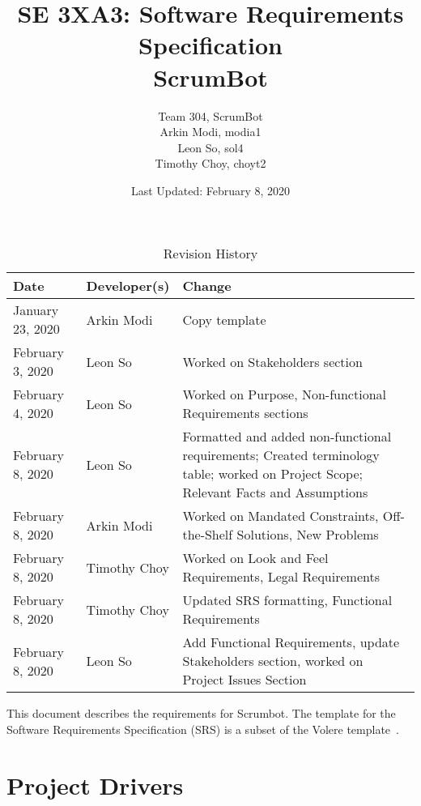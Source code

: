 \documentclass[12pt, titlepage]{article}
\title{SE 3XA3: Software Requirements Specification\\ScrumBot}
\author{
    Team 304, ScrumBot
        \\ Arkin Modi, modia1
        \\ Leon So, sol4
        \\ Timothy Choy, choyt2
}
\date{Last Updated: February 8, 2020}
\begin{document}
\maketitle

\tableofcontents
\listoftables
\listoffigures

\newpage

\begin{table}[!hbp]
    \caption{Revision History} \label{TblRevisionHistory}
    \begin{tabularx}{\textwidth}{llX}
        \toprule
            \textbf{Date} & \textbf{Developer(s)} & \textbf{Change}\\
        \midrule
            January 23, 2020 & Arkin Modi & Copy template\\
            February 3, 2020 & Leon So & Worked on Stakeholders section\\
            February 4, 2020 & Leon So & Worked on Purpose, Non-functional Requirements sections\\
            February 8, 2020 & Leon So & Formatted and added non-functional requirements; Created terminology table; worked on Project Scope; Relevant Facts and Assumptions\\
            February 8, 2020 & Arkin Modi & Worked on Mandated Constraints, Off-the-Shelf Solutions, New Problems\\
            February 8, 2020 & Timothy Choy & Worked on Look and Feel Requirements, Legal Requirements\\
            February 8, 2020 & Timothy Choy & Updated SRS formatting, Functional Requirements\\
            February 8, 2020 & Leon So & Add Functional Requirements, update Stakeholders section, worked on Project Issues Section\\
        \bottomrule
    \end{tabularx}
\end{table}

\FloatBarrier

\newpage


This document describes the requirements for Scrumbot. The template for the Software Requirements Specification (SRS) is a subset of the Volere template~\citep{RobertsonAndRobertson2012}.  

\section{Project Drivers}
\end{document}
